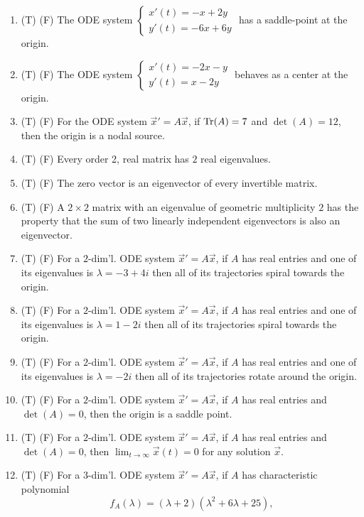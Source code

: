 \documentclass[12pt]{article}
\begin{document}
\begin{enumerate}
   \item (T) (F) The ODE system \(\begin{cases}
            x'(t)=-x+2y \\
            y'(t)=-6x+6y
         \end{cases}\) has a saddle-point at the origin.
   \item (T) (F) The ODE system \(\begin{cases}
            x'(t)=-2x-y \\
            y'(t)=x-2y
         \end{cases}\) behaves as a center at the origin.
   \item (T) (F) For the ODE system \(\vec{x}'=A\vec{x}\), if \(\Tr(A)=7\) and \(\det(A)=12\), then the origin is a nodal source.
   \item (T) (F) Every order 2, real matrix has \(2\) real eigenvalues.
   \item (T) (F) The zero vector is an eigenvector of every invertible matrix.
   \item (T) (F) A \(2\times 2\) matrix with an eigenvalue of geometric multiplicity \(2\) has the property that the sum of two linearly independent eigenvectors is also an eigenvector.
   \item (T) (F) For a \(2\)-dim'l. ODE system \(\vec{x}'=A\vec{x}\), if \(A\) has real entries and one of its eigenvalues is \(\lambda=-3+4i\) then all of its trajectories spiral towards the origin.
   \item (T) (F) For a \(2\)-dim'l. ODE system \(\vec{x}'=A\vec{x}\), if \(A\) has real entries and one of its eigenvalues is \(\lambda=1-2i\) then all of its trajectories spiral towards the origin.
   \item (T) (F) For a \(2\)-dim'l. ODE system \(\vec{x}'=A\vec{x}\), if \(A\) has real entries and one of its eigenvalues is \(\lambda=-2i\) then all of its trajectories rotate around the origin.
   \item (T) (F) For a \(2\)-dim'l. ODE system \(\vec{x}'=A\vec{x}\), if \(A\) has real entries and \(\det(A)=0\), then the origin is a saddle point.
   \item (T) (F) For a \(2\)-dim'l. ODE system \(\vec{x}'=A\vec{x}\), if \(A\) has real entries and \(\det(A)=0\), then \(\lim_{t\to\infty}\vec{x}(t)=0\) for any solution \(\vec{x}\).
   \item (T) (F) For a \(3\)-dim'l. ODE system \(\vec{x}'=A\vec{x}\), if \(A\) has characteristic polynomial
         \[f_A(\lambda)=(\lambda+2)(\lambda^2+6\lambda+25),\]

\end{enumerate}
\end{document}
